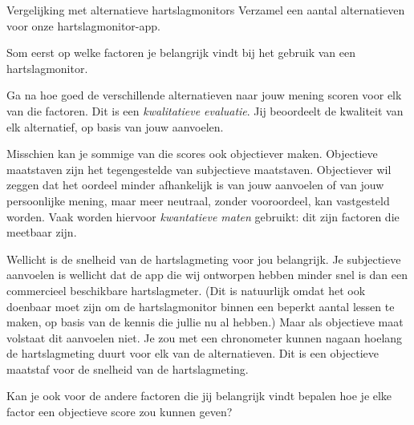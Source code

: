 \begin{opdracht}{Vergelijking met alternatieve hartslagmonitors}
Verzamel een aantal alternatieven voor onze hartslagmonitor-app. 

Som eerst op welke factoren je belangrijk vindt bij het gebruik van een hartslagmonitor. 

Ga na hoe goed de verschillende alternatieven naar jouw mening scoren voor elk van die factoren. Dit is een \emph{kwalitatieve evaluatie}. Jij beoordeelt de kwaliteit van elk alternatief, op basis van jouw aanvoelen.

Misschien kan je sommige van die scores ook objectiever maken. Objectieve maatstaven zijn het tegengestelde van subjectieve maatstaven. Objectiever wil zeggen dat het oordeel minder afhankelijk is van jouw aanvoelen of van jouw persoonlijke mening, maar meer neutraal, zonder vooroordeel, kan vastgesteld worden. Vaak worden hiervoor \emph{kwantatieve maten} gebruikt: dit zijn factoren die meetbaar zijn. 

Wellicht is de snelheid van de hartslagmeting voor jou belangrijk. Je subjectieve aanvoelen is wellicht dat de app die wij ontworpen hebben minder snel is dan een commercieel beschikbare hartslagmeter. (Dit is natuurlijk omdat het ook doenbaar moet zijn om de hartslagmonitor binnen een beperkt aantal lessen te maken, op basis van de kennis die jullie nu al hebben.) Maar als objectieve maat volstaat dit aanvoelen niet. Je zou met een chronometer kunnen nagaan hoelang de hartslagmeting duurt voor elk van de alternatieven. Dit is een objectieve maatstaf voor de snelheid van de hartslagmeting. 

Kan je ook voor de andere factoren die jij belangrijk vindt bepalen hoe je elke factor een objectieve score zou kunnen geven?
\end{opdracht}



